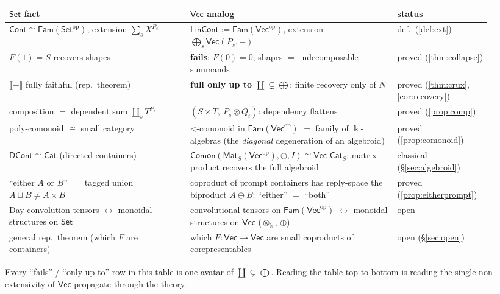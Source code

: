 \documentclass[11pt]{amsart}
\theoremstyle{plain}
\theoremstyle{definition}
\renewcommand{\Vec}{\mathsf{Vec}}
\newcommand{\Set}{\mathsf{Set}}
\newcommand{\Cat}{\mathsf{Cat}}
\newcommand{\Cont}{\mathsf{Cont}}
\newcommand{\LinCont}{\mathsf{LinCont}}
\newcommand{\Fam}{\mathsf{Fam}}
\newcommand{\Comon}{\mathsf{Comon}}
\newcommand{\Mat}{\mathsf{Mat}}
\newcommand{\VCat}{\Vec\text{-}\mathsf{Cat}}
\newcommand{\op}{\mathrm{op}}
\newcommand{\ext}[1]{\llbracket #1 \rrbracket}
\newcommand{\fld}{\Bbbk}
\newcommand{\bul}{{-}}
\newcommand{\iso}{\cong}
\DeclareMathOperator{\dcoprod}{\textstyle\coprod}
\begin{document}
\begin{center}\small
\renewcommand{\arraystretch}{1.5}
\begin{tabular}{@{}p{0.35\linewidth}p{0.40\linewidth}>{\raggedright\arraybackslash}p{0.17\linewidth}@{}}
\hline
\textbf{$\Set$ fact} & \textbf{$\Vec$ analog} & \textbf{status}\\
\hline
$\Cont\iso\Fam(\Set^\op)$, extension $\sum_s X^{P_s}$ &
$\LinCont:=\Fam(\Vec^\op)$, extension $\bigoplus_s\Vec(P_s,\bul)$ &
def.\ (\ref{def:ext})\\
$F(1)=S$ recovers shapes &
\textbf{fails}: $F(0)=0$; shapes $=$ indecomposable summands &
proved (\ref{thm:collapse})\\
$\ext{\bul}$ fully faithful (rep.\ theorem) &
\textbf{full only up to $\dcoprod\subsetneq\bigoplus$}; finite recovery only
of $N$ &
proved (\ref{thm:crux},\,\ref{cor:recovery})\\
composition $=$ dependent sum $\dcoprod_s T^{P_s}$ &
$(S{\times}T,\ P_s\otimes Q_t)$: dependency flattens &
proved (\ref{prop:comp})\\
poly-comonoid $\iso$ small category &
$\lhd$-comonoid in $\Fam(\Vec^\op)$ $=$ family of $\fld$-algebras (the
\emph{diagonal} degeneration of an algebroid) &
proved (\ref{prop:comonoid})\\
$\mathsf{DCont}\iso\Cat$ (directed containers) &
$\Comon(\Mat_S(\Vec^\op),\odot,I)\iso\VCat_S$: matrix product recovers the full
algebroid &
classical (\S\ref{sec:algebroid})\\
``either $A$ or $B$'' $=$ tagged union $A\sqcup B\neq A\times B$ &
coproduct of prompt containers has reply-space the biproduct $A\oplus B$: ``either''
$=$ ``both'' &
proved (\ref{prop:eitherprompt})\\
Day-convolution tensors $\leftrightarrow$ monoidal structures on $\Set$ &
convolutional tensors on $\Fam(\Vec^\op)$ $\leftrightarrow$ monoidal
structures on $\Vec$ ($\otimes_\fld$, $\oplus$) &
open\\
general rep.\ theorem (which $F$ are containers) &
which $F\colon\Vec\to\Vec$ are small coproducts of corepresentables &
open (\S\ref{sec:open})\\
\hline
\end{tabular}
\end{center}

Every ``fails'' / ``only up to'' row in this table is one avatar of
$\dcoprod\subsetneq\bigoplus$. Reading the table top to bottom is reading the
single non-extensivity of $\Vec$ propagate through the theory.
\end{document}
